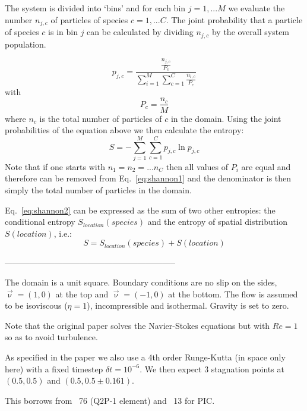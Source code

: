 
The system is divided into `bins' and for each bin $j=1,...M$ we evaluate the number $n_{j,c}$
of particles of species $c=1,...C$.
The joint probability that a particle of species $c$
is in bin $j$ can be calculated by dividing $n_{j,c}$ by the overall system population.

\begin{equation}
p_{j,c} = \frac{\frac{n_{j,c}}{P_c}}{\sum\limits_{i=1}^M \sum\limits_{c=1}^C \frac{n_{i,c}}{P_c}}
\label{eq:shannon1}
\end{equation}
with 
\[
P_c = \frac{n_c}{M}
\]
where $n_c$ is the total number of particles of $c$ in the domain.
Using the joint probabilities of the equation above we then calculate the entropy:
\begin{equation}
S= -\sum_{j=1}^M \sum_{c=1}^C p_{j,c} \ln p_{j,c}
\label{eq:shannon2}
\end{equation}
Note that if one starts with $n_1=n_2=...n_C$ then all values of $P_i$ are equal and 
therefore can be removed from Eq.~\eqref{eq:shannon1} and the denominator is then simply 
the total number of particles in the domain.

Eq.~\eqref{eq:shannon2} can be expressed as the sum of two other entropies:
the conditional entropy $S_{location}(species)$ and the entropy of spatial 
distribution $S(location)$, i.e.:
\[
S=S_{location}(species) + S(location)
\]



--------------------------------------------------------------

The domain is a unit square. Boundary conditions are no slip on the sides, 
$\vec\upnu=(1,0)$ at the top and $\vec\upnu=(-1,0)$ at the bottom.
The flow is assumed to be isoviscous ($\eta=1$), incompressible and isothermal. 
Gravity is set to zero.

Note that the original paper \cite{cakm06} solves the Navier-Stokes equations but with $Re=1$
so as to avoid turbulence.

As specified in the paper we also use a 4th order Runge-Kutta (in space only here)
with a fixed timestep $\delta t=10^{-6}$.
We then expect 3 stagnation points at $(0.5,0.5)$ and $(0.5,0.5\pm 0.161)$.

This \stone borrows from \stone~76 (Q2P-1 element) and \stone~13 for PIC.


